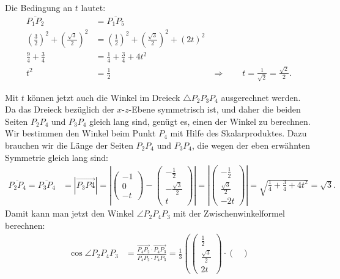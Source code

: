 \begin{loesung}
\begin{teilaufgaben}
\item Die Bedingung an $t$ lautet:
\begin{align*}
\overline{P_1P_2}&=\overline{P_1P_5}\\
\left(\frac32\right)^2+\left(\frac{\sqrt{3}}2\right)^2
	&=\left(\frac12\right)^2+\left(\frac{\sqrt{3}}2\right)^2+(2t)^2\\
\frac94+\frac34&=\frac14+\frac34+4t^2\\
t^2&=\frac12&\Rightarrow\qquad t=\frac1{\sqrt{2}}=\frac{\sqrt{2}}2.
\end{align*}
\item Mit $t$ können jetzt auch die Winkel im Dreieck $\triangle P_2P_3P_4$
ausgerechnet werden. Da das Dreieck bezüglich der $x$-$z$-Ebene
symmetrisch ist, und daher die beiden Seiten $P_2P_4$ und $P_3P_4$
gleich lang sind, genügt es, einen der Winkel zu berechnen.
Wir bestimmen den Winkel beim Punkt $P_4$ mit Hilfe des Skalarproduktes.
Dazu brauchen wir die Länge der Seiten $P_2P_4$ und $P_3P_4$, die wegen der
eben erwähnten Symmetrie gleich lang sind:
\begin{align*}
\overline{P_2P_4}=\overline{P_3P_4}
&=|\overrightarrow{P_3P4}|
=
\left|
\begin{pmatrix}
-1\\0\\-t
\end{pmatrix}
-
\begin{pmatrix}
-\frac12\\-\frac{\sqrt{3}}2\\t
\end{pmatrix}
\right|
=
\left|
\begin{pmatrix}
-\frac12\\\frac{\sqrt{3}}2\\-2t
\end{pmatrix}
\right|
=\sqrt{\frac14+\frac34+4t^2}=\sqrt{3}.
\end{align*}
Damit kann man jetzt den Winkel $\angle P_2P_4P_3$ mit der Zwischenwinkelformel
berechnen:
\begin{align*}
\cos\angle P_2P_4P_3
&=\frac{\overrightarrow{P_4P_2}\cdot\overrightarrow{P_4P_3}}{\overline{P_4P_2}\cdot\overline{P_4P_3}}
=\frac13\left(
\begin{pmatrix}
\frac12 \\ \frac{\sqrt{3}}2\\2t
\end{pmatrix}
\cdot
\begin{pmatrix}

\end{pmatrix}
\end{align*}
\end{teilaufgaben}
\end{loesung}

